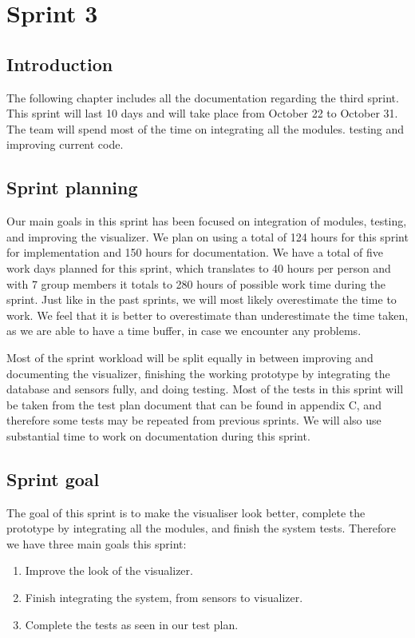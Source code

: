 \documentclass[../document]{subfiles}
\begin{document}
\section{Sprint 3}

\subsection{Introduction}
The following chapter includes all the documentation regarding the third sprint. This sprint will last 10 days and will take place from October 22 to October 31. The team will spend most of the time on integrating all the modules. testing and improving current code.

\subsection{Sprint planning}
Our main goals in this sprint has been focused on integration of modules, testing, and improving the visualizer. We plan on using a total of 124 hours for this sprint for implementation and 150 hours for documentation. We have a total of five work days planned for this sprint, which translates to 40 hours per person and with 7 group members it totals to 280 hours of possible work time during the sprint. Just like in the past sprints, we will most likely overestimate the time to work. We feel that it is better to overestimate than underestimate the time taken, as we are able to have a time buffer, in case we encounter any problems.

Most of the sprint workload will be split equally in between improving and documenting the visualizer, finishing the working prototype by integrating the database and sensors fully, and doing testing. Most of the tests in this sprint will be taken from the test plan document that can be found in appendix C, and therefore some tests may be repeated from previous sprints. We will also use substantial time to work on documentation during this sprint.

\subsection{Sprint goal}
The goal of this sprint is to make the visualiser look better, complete the prototype by integrating all the modules, and finish the system tests. Therefore we have three main goals this sprint:
\begin{enumerate}
	\item
	Improve the look of the visualizer.
	\item
	Finish integrating the system, from sensors to visualizer.
	\item
	Complete the tests as seen in our test plan.
\end{enumerate}
\end{document}
